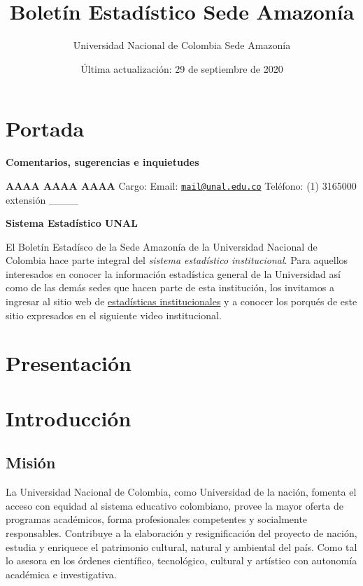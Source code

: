 \documentclass[
]{book}
\title{Boletín Estadístico Sede Amazonía}
\author{ Universidad Nacional de Colombia Sede Amazonía}
\date{Última actualización: 29 de septiembre de 2020}
\begin{document}
\maketitle

{
\setcounter{tocdepth}{1}
\tableofcontents
}
\hypertarget{portada}{%
\chapter*{Portada}\label{portada}}

\textbf{Comentarios, sugerencias e inquietudes}

\textbf{AAAA AAAA AAAA}
Cargo:
Email: \href{mailto:mail@unal.edu.co}{\nolinkurl{mail@unal.edu.co}}
Teléfono: (1) 3165000 extensión \_\_\_\_

\textbf{Sistema Estadístico UNAL}

El Boletín Estadísco de la Sede Amazonía de la Universidad Nacional de Colombia hace parte integral del \emph{sistema estadístico institucional}. Para aquellos interesados en conocer la información estadística general de la Universidad así como de las demás sedes que hacen parte de esta institución, los invitamos a ingresar al sitio web de \href{http://estadisticas.unal.edu.co/home/}{estadísticas institucionales} y a conocer los porqués de este sitio expresados en el siguiente video institucional.

\hypertarget{Presenta}{%
\chapter*{Presentación}\label{Presenta}}

\hypertarget{intro}{%
\chapter*{Introducción}\label{intro}}

\hypertarget{mision}{%
\section*{Misión}\label{mision}}

La Universidad Nacional de Colombia, como Universidad de la nación, fomenta el acceso con equidad al sistema educativo colombiano, provee la mayor oferta de programas académicos, forma profesionales competentes y socialmente responsables. Contribuye a la elaboración y resignificación del proyecto de nación, estudia y enriquece el patrimonio cultural, natural y ambiental del país. Como tal lo asesora en los órdenes científico, tecnológico, cultural y artístico con autonomía académica e investigativa.
\end{document}
